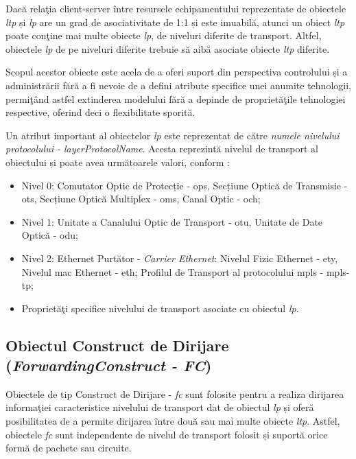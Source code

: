 Dacă relaţia client-server între resursele echipamentului reprezentate de obiectele \textit{\gls{ltp}} și \textit{\gls{lp}} are un grad de asociativitate de 1:1 și este imuabilă, atunci un obiect \textit{\gls{ltp}} poate conţine mai multe obiecte \textit{\gls{lp}}, de niveluri diferite de transport. Altfel, obiectele \textit{\gls{lp}} de pe niveluri diferite trebuie să aibă asociate obiecte \textit{\gls{ltp}} diferite.

Scopul acestor obiecte este acela de a oferi suport din perspectiva controlului și a administrării fără a fi nevoie de a defini atribute specifice unei anumite tehnologii, permiţând astfel extinderea modelului fără a depinde de proprietăţile tehnologiei respective, oferind deci o flexibilitate sporită.

Un atribut important al obiectelor \textit{\gls{lp}} este reprezentat de către \textit{numele nivelului protocolului - layerProtocolName}. Acesta reprezintă nivelul de transport al obiectului și poate avea următoarele valori, conform \cite{onftr512v1.2}:

\begin{itemize}
	\item Nivel 0: Comutator Optic de Protecție - \gls{ops}, Secțiune Optică de Transmisie - \gls{ots}, Secțiune Optică Multiplex - \gls{oms}, Canal Optic - \gls{och};
	\item Nivel 1: Unitate a Canalului Optic de Transport - \gls{otu}, Unitate de Date Optică - \gls{odu};
	\item Nivel 2: Ethernet Purtător - \textit{Carrier Ethernet}: Nivelul Fizic Ethernet - \gls{ety}, Nivelul \gls{mac} Ethernet - \gls{eth}; Profilul de Transport al protocolului \gls{mpls} - \gls{mpls-tp};
	\item Proprietăţi specifice nivelului de transport asociate cu obiectul \textit{\gls{lp}}.
\end{itemize}

\subsection{Obiectul Construct de Dirijare  (\textit{ForwardingConstruct - FC})}

Obiectele de tip Construct de Dirijare - \textit{\gls{fc}} sunt folosite pentru a realiza dirijarea informaţiei caracteristice nivelului de transport dat de obiectul \textit{\gls{lp}} și oferă posibilitatea de a permite dirijarea între două sau mai multe obiecte \textit{\gls{ltp}}. Astfel, obiectele \textit{\gls{fc}} sunt independente de nivelul de transport folosit și suportă orice formă de pachete sau circuite.

